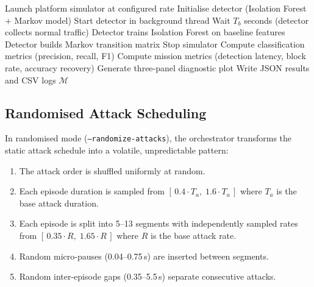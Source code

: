 \begin{algorithm}[t]
\caption{Orchestrator: evaluation scenario execution}\label{alg:orchestrator}
\DontPrintSemicolon
{}
\BlankLine
Launch platform simulator at configured rate\;
Initialise detector (Isolation Forest + Markov model)\;
Start detector in background thread\;
\BlankLine
{}
Wait $T_b$ seconds (detector collects normal traffic)\;
Detector trains Isolation Forest on baseline features\;
Detector builds Markov transition matrix\;
\BlankLine
{}
\BlankLine
{}
Stop simulator\;
Compute classification metrics (precision, recall, F1)\;
Compute mission metrics (detection latency, block rate, accuracy recovery)\;
Generate three-panel diagnostic plot\;
Write JSON results and CSV logs\;
\Return $\mathcal{M}$\;
\end{algorithm}

\subsection{Randomised Attack Scheduling}

In randomised mode (\texttt{--randomize-attacks}), the orchestrator transforms the static attack schedule into a volatile, unpredictable pattern:

\begin{enumerate}
    \item The attack order is shuffled uniformly at random.
    \item Each episode duration is sampled from $[\,0.4 \cdot T_a,\; 1.6 \cdot T_a\,]$ where $T_a$ is the base attack duration.
    \item Each episode is split into 5--13 segments with independently sampled rates from $[\,0.35 \cdot R,\; 1.65 \cdot R\,]$ where $R$ is the base attack rate.
    \item Random micro-pauses (0.04--0.75\,s) are inserted between segments.
    \item Random inter-episode gaps (0.35--5.5\,s) separate consecutive attacks.
\end{enumerate}

